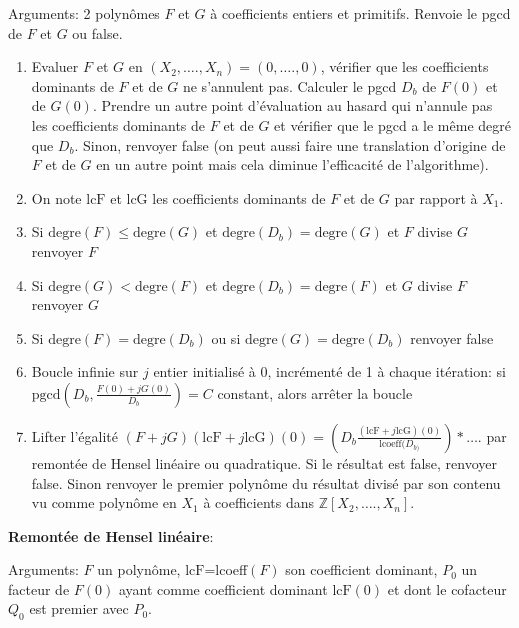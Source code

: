 \documentclass[a4paper,11pt]{article}
\begin{document}
Arguments: 2 polynômes $F$ et $G$ à coefficients entiers et primitifs. Renvoie
le pgcd de $F$ et $G$ ou false.
\begin{enumerate}
  \item Evaluer $F$ et $G$ en $( X_2, \ldots ., X_n ) = ( 0, \ldots ., 0 )$,
  vérifier que les coefficients dominants de $F$ et de $G$ ne s'annulent pas.
  Calculer le pgcd $D_b$ de $F ( 0 )$ et de $G ( 0 )$. Prendre un autre point
  d'évaluation au hasard qui n'annule pas les coefficients dominants de $F$ et
  de $G$ et vérifier que le pgcd a le même degré que $D_b$. Sinon, renvoyer
  false (on peut aussi faire une translation d'origine de $F$ et de $G$ en un
  autre point mais cela diminue l'efficacité de l'algorithme).
  
  \item On note $\mbox{lcF}$ et $\mbox{lcG}$ les coefficients dominants de $F$
  et de $G$ par rapport à $X_1$.
  
  \item Si $\mbox{degre} ( F ) \leqslant \mbox{degre} ( G )$ et $\mbox{degre}
  ( D_b ) = \mbox{degre} ( G )$ et $F$ divise $G$ renvoyer $F$
  
  \item Si $\mbox{degre} ( G ) < \mbox{degre} ( F )$ et $\mbox{degre} ( D_b )
  = \mbox{degre} ( F )$ et $G$ divise $F$ renvoyer $G$
  
  \item Si $\mbox{degre} ( F ) = \mbox{degre} ( D_b )$ ou si $\mbox{degre} ( G
  ) = \mbox{degre} ( D_b )$ renvoyer false
  
  \item Boucle infinie sur $j$ entier initialisé à 0, incrémenté de 1 à chaque
  itération: si $\mbox{pgcd} ( D_b, \frac{F ( 0 ) + j G ( 0 )}{D_b} ) = C$
  constant, alors arrêter la boucle
  
  \item Lifter l'égalité $( F + j G ) ( \mbox{lcF} + j \mbox{lcG} ) ( 0 ) =
  \left( D_b  \frac{( \mbox{lcF} + j \mbox{lcG} ) ( 0 )}{\mbox{lcoeff} ( D_{b
  )}} \right) \ast \ldots .$ par remontée de Hensel linéaire ou quadratique.
  Si le résultat est false, renvoyer false. Sinon renvoyer le premier polynôme
  du résultat divisé par son contenu vu comme polynôme en $X_1$ à coefficients
  dans $\mathbb{Z} [ X_2, \ldots ., X_n ]$.
\end{enumerate}
{\bf{Remontée de Hensel linéaire}}:

Arguments: $F$ un polynôme, $\mbox{lcF}$=lcoeff$(F)$ 
son coefficient dominant, $P_0$ un
facteur de $F ( 0 )$ ayant comme coefficient dominant $\mbox{lcF} ( 0 )$ et
dont le cofacteur $Q_0$ est premier avec $P_0$.
\end{document}
